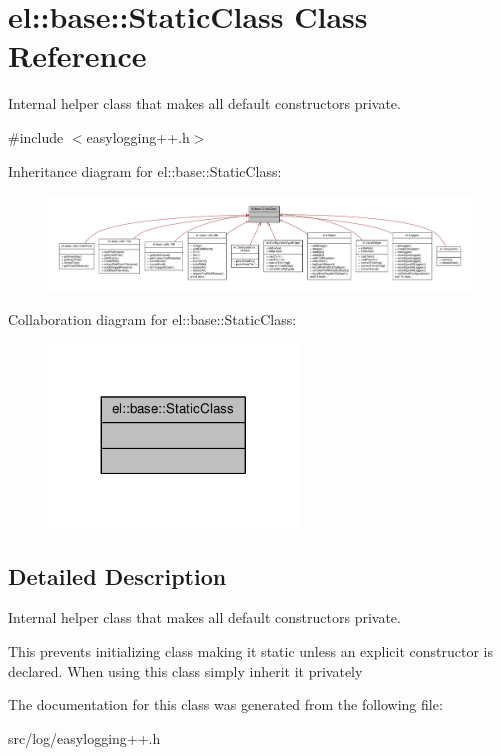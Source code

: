 \hypertarget{classel_1_1base_1_1StaticClass}{}\section{el\+:\+:base\+:\+:Static\+Class Class Reference}
\label{classel_1_1base_1_1StaticClass}


Internal helper class that makes all default constructors private.  




{\ttfamily \#include $<$easylogging++.\+h$>$}



Inheritance diagram for el\+:\+:base\+:\+:Static\+Class\+:
\nopagebreak
\begin{figure}[H]
\begin{center}
\leavevmode
\includegraphics[width=350pt]{dd/dc3/classel_1_1base_1_1StaticClass__inherit__graph}
\end{center}
\end{figure}


Collaboration diagram for el\+:\+:base\+:\+:Static\+Class\+:
\nopagebreak
\begin{figure}[H]
\begin{center}
\leavevmode
\includegraphics[width=188pt]{d4/df1/classel_1_1base_1_1StaticClass__coll__graph}
\end{center}
\end{figure}


\subsection{Detailed Description}
Internal helper class that makes all default constructors private. 

This prevents initializing class making it static unless an explicit constructor is declared. When using this class simply inherit it privately 

The documentation for this class was generated from the following file\+:\begin{DoxyCompactItemize}
\item 
src/log/easylogging++.\+h\end{DoxyCompactItemize}
